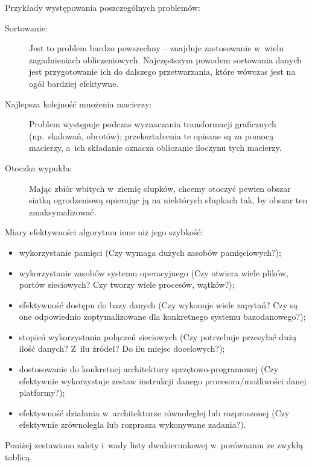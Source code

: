 
\exercise %
Przykłady występowania poszczególnych problemów:
\begin{description}
	\item[Sortowanie:] Jest to problem bardzo powszechny -- znajduje zastosowanie w~wielu zagadnieniach obliczeniowych.
Najczęstszym powodem sortowania danych jest przygotowanie ich do dalszego przetwarzania, które wówczas jest na ogół bardziej efektywne.
	\item[Najlepsza kolejność mnożenia macierzy:] Problem występuje podczas wyznaczania transformacji graficznych (np.\ skalowań, obrotów); przekształcenia te opisane są za pomocą macierzy, a~ich składanie oznacza obliczanie iloczynu tych macierzy.
	\item[Otoczka wypukła:] Mając zbiór wbitych w~ziemię słupków, chcemy otoczyć pewien obszar siatką ogrodzeniową opierając ją na niektórych słupkach tak, by obszar ten zmaksymalizować.
\end{description}

\exercise %
Miary efektywności algorytmu inne niż jego szybkość:
\begin{itemize}
	\item wykorzystanie pamięci
(Czy wymaga dużych zasobów pamięciowych?);
	\item wykorzystanie zasobów systemu operacyjnego
(Czy otwiera wiele plików, portów sieciowych?
Czy tworzy wiele procesów, wątków?);
	\item efektywność dostępu do bazy danych
(Czy wykonuje wiele zapytań?
Czy są one odpowiednio zoptymalizowane dla konkretnego systemu bazodanowego?);
	\item stopień wykorzystania połączeń sieciowych
(Czy potrzebuje przesyłać dużą ilość danych?
Z~ilu źródeł?
Do ilu miejsc docelowych?);
	\item dostosowanie do konkretnej architektury sprzętowo-programowej
(Czy efektywnie wykorzystuje zestaw instrukcji danego procesora/możliwości danej platformy?);
	\item efektywność działania w~architekturze równoległej lub rozproszonej
(Czy efektywnie zrównolegla lub rozprasza wykonywane zadania?).
\end{itemize}

\exercise %
Poniżej zestawiono zalety i~wady listy dwukierunkowej w~porównaniu ze zwykłą tablicą.

